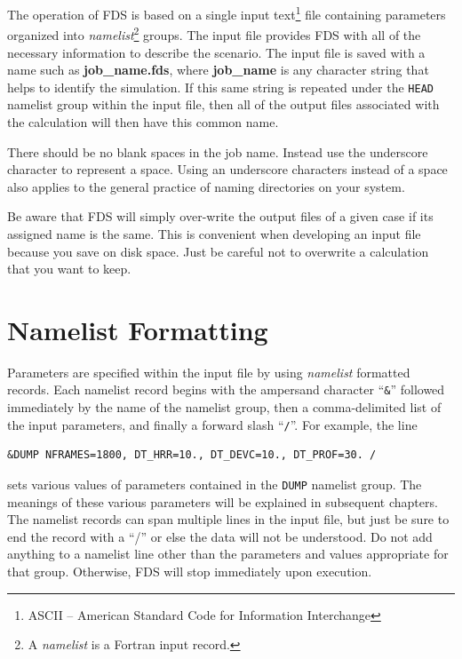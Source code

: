 \documentclass[11pt]{book}
\newcommand{\ct}{\tt\small}
\begin{document}
The operation of FDS is based on a single input text\footnote{ASCII -- American Standard Code
for Information Interchange} file containing parameters organized into
{\em namelist}\footnote{A {\em namelist} is a Fortran input record.} groups. 
The input file provides FDS  with all of the necessary information to
describe the scenario.
The input file is saved with a name such as {\bf job\_name.fds},
where {\bf job\_name} is any character string that helps to identify
the simulation. If this same string is repeated under the {\ct HEAD} namelist group within the
input file, then all of the output files associated with the calculation will then have this common name.

There should be no blank spaces in the job name. Instead use the underscore
character to represent a space.  Using an underscore characters instead of a space also applies
to the general practice of naming directories on your system.

Be aware that FDS will simply over-write the output files of a given case if its assigned
name is the same. This is convenient when developing an input file because you save on disk space. Just be careful
not to overwrite a calculation that you want to keep.



\section{Namelist Formatting}

\noindent
Parameters are specified within the input file by using {\em namelist} formatted records.
Each namelist record begins with the ampersand character ``{\ct \&}'' followed
immediately by the name of the namelist group, then a comma-delimited list of the input parameters, and
finally a forward slash ``{\ct /}''. For example, the line

\footnotesize
\begin{verbatim}
&DUMP NFRAMES=1800, DT_HRR=10., DT_DEVC=10., DT_PROF=30. /
\end{verbatim}

\normalsize \noindent
sets various values of parameters contained in the {\ct DUMP} namelist group. The meanings of these various parameters will
be explained in subsequent chapters. The namelist records can span multiple lines in the input file, but just be sure to
end the record with a ``/'' or else the data will not be understood. Do not add anything to a namelist line other than the
parameters and values appropriate for that group. Otherwise, FDS will stop immediately upon execution.
\end{document}
